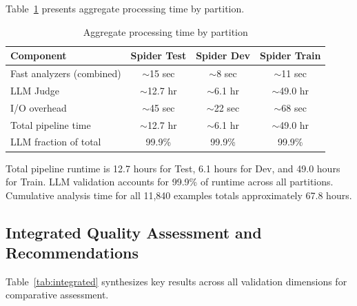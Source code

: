 \documentclass[]{einformatica}
\begin{document}
Table~\ref{tab:aggregate_performance} presents aggregate processing time by partition.

\begin{table}[ht]
    \caption{Aggregate processing time by partition}
    \label{tab:aggregate_performance}
    \centering
    \footnotesize
    \begin{tabular}{lccc}
        \toprule
        \textbf{Component} & \textbf{Spider Test} & \textbf{Spider Dev} & \textbf{Spider Train} \\
        \midrule
        Fast analyzers (combined) & $\sim$15 sec & $\sim$8 sec & $\sim$11 sec \\
        LLM Judge & $\sim$12.7 hr & $\sim$6.1 hr & $\sim$49.0 hr \\
        I/O overhead & $\sim$45 sec & $\sim$22 sec & $\sim$68 sec \\
        Total pipeline time & $\sim$12.7 hr & $\sim$6.1 hr & $\sim$49.0 hr \\
        LLM fraction of total & 99.9\% & 99.9\% & 99.9\% \\
        \bottomrule
    \end{tabular}
\end{table}

Total pipeline runtime is 12.7 hours for Test, 6.1 hours for Dev, and 49.0 hours for Train. LLM validation accounts for 99.9\% of runtime across all partitions. Cumulative analysis time for all 11,840 examples totals approximately 67.8 hours.

\subsection{Integrated Quality Assessment and Recommendations}\label{sec:integrated}

Table~\ref{tab:integrated} synthesizes key results across all validation dimensions for comparative assessment.
\end{document}
